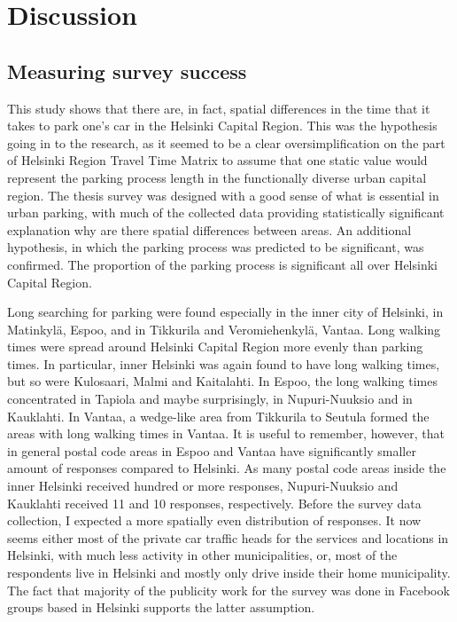\section{Discussion}
\subsection{Measuring survey success}
\justify

This study shows that there are, in fact, spatial differences in the time that it takes to park one's car in the Helsinki Capital Region. This was the hypothesis going in to the research, as it seemed to be a clear oversimplification on the part of Helsinki Region Travel Time Matrix to assume that one static value would represent the parking process length in the functionally diverse urban capital region. The thesis survey was designed with a good sense of what is essential in urban parking, with much of the collected data providing statistically significant explanation why are there spatial differences between areas. An additional hypothesis, in which the parking process was predicted to be significant, was confirmed. The proportion of the parking process is significant all over Helsinki Capital Region.

Long searching for parking were found especially in the inner city of Helsinki, in Matinkylä, Espoo, and in Tikkurila and Veromiehenkylä, Vantaa. Long walking times were spread around Helsinki Capital Region more evenly than parking times. In particular, inner Helsinki was again found to have long walking times, but so were Kulosaari, Malmi and Kaitalahti. In Espoo, the long walking times concentrated in Tapiola and maybe surprisingly, in Nupuri-Nuuksio and in Kauklahti. In Vantaa, a wedge-like area from Tikkurila to Seutula formed the areas with long walking times in Vantaa. It is useful to remember, however, that in general postal code areas in Espoo and Vantaa have significantly smaller amount of responses compared to Helsinki. As many postal code areas inside the inner Helsinki received hundred or more responses, Nupuri-Nuuksio and Kauklahti received 11 and 10 responses, respectively. Before the survey data collection, I expected a more spatially even distribution of responses. It now seems either most of the private car traffic heads for the services and locations in Helsinki, with much less activity in other municipalities, or, most of the respondents live in Helsinki and mostly only drive inside their home municipality. The fact that majority of the publicity work for the survey was done in Facebook groups based in Helsinki supports the latter assumption.

